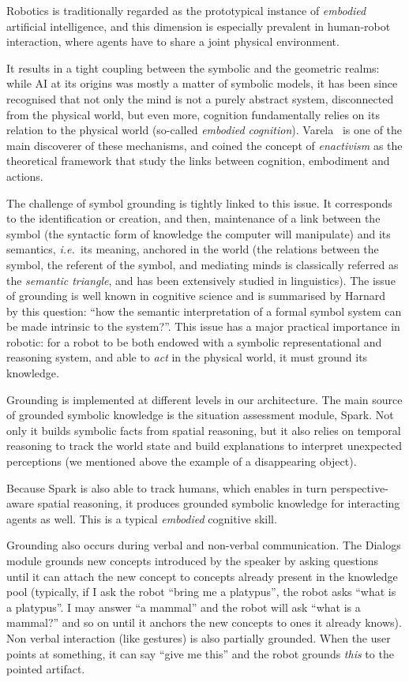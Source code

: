 \documentclass[preprint,3p,times]{elsarticle}
\newcommand{\ie}{{\textit{i.e.\ }}}
\begin{document}
Robotics is traditionally regarded as the prototypical instance of \emph{embodied}
artificial intelligence, and this dimension is especially prevalent in
human-robot interaction, where agents have to share a joint physical
environment.

It results in a tight coupling between the symbolic and the geometric realms:
while AI at its origins was mostly a matter of symbolic models, it has been
since recognised that not only the mind is not a purely abstract system,
disconnected from the physical world, but even more, cognition fundamentally
relies on its relation to the physical world (so-called \emph{embodied
cognition}). Varela~\cite{Varela1992} is one of the main discoverer of these
mechanisms, and coined the concept of \emph{enactivism} as the theoretical
framework that study the links between cognition, embodiment and actions.

The challenge of symbol grounding is tightly linked to this issue. It
corresponds to the identification or creation, and then, maintenance of a link
between the symbol (the syntactic form of knowledge the computer will
manipulate) and its semantics, \ie its meaning, anchored in the world (the
relations between the symbol, the referent of the symbol, and mediating minds
is classically referred as the \emph{semantic triangle}, and has been
extensively studied in linguistics). The issue of grounding is well known in
cognitive science and is summarised by Harnard~\cite{Harnad1990} by this
question: ``how the semantic interpretation of a formal symbol system can be
made intrinsic to the system?''. This issue has a major practical importance in
robotic: for a robot to be both endowed with a symbolic representational and
reasoning system, and able to \emph{act} in the physical world, it must ground
its knowledge.

Grounding is implemented at different levels in our architecture. The main source
of grounded symbolic knowledge is the situation assessment module, {\sc Spark}.
Not only it builds symbolic facts from spatial reasoning, but it also relies on
temporal reasoning to track the world state and build explanations to interpret
unexpected perceptions (we mentioned above the example of a disappearing
object).

Because {\sc Spark} is also able to track humans, which enables in turn
perspective-aware spatial reasoning, it produces grounded symbolic knowledge
for interacting agents as well. This is a typical \emph{embodied} cognitive
skill.

Grounding also occurs during verbal and non-verbal communication. The {\sc
Dialogs} module grounds new concepts introduced by the speaker by asking questions
until it can attach the new concept to concepts already present in the
knowledge pool (typically, if I ask the robot ``bring me a platypus'', the
robot asks ``what is a platypus''. I may answer ``a mammal'' and the robot will
ask ``what is a mammal?'' and so on until it anchors the new concepts to ones
it already knows). Non verbal interaction (like gestures) is also partially
grounded. When the user points at something, it can say ``give me this'' and
the robot grounds \emph{this} to the pointed artifact.
\end{document}
